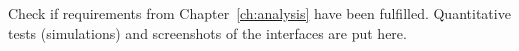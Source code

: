 Check if requirements from Chapter~\ref{ch:analysis}
have been fulfilled.
Quantitative tests (simulations) and screenshots of the
interfaces are put here.
